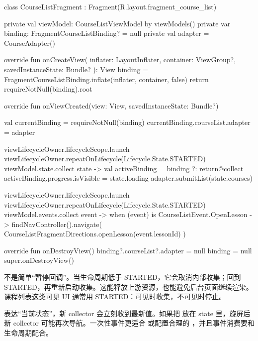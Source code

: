 \begin{ktfix}
class CourseListFragment : Fragment(R.layout.fragment_course_list) {

    private val viewModel: CourseListViewModel by viewModels()
    private var binding: FragmentCourseListBinding? = null
    private val adapter = CourseAdapter()

    override fun onCreateView(
        inflater: LayoutInflater,
        container: ViewGroup?,
        savedInstanceState: Bundle?
    ): View {
        binding = FragmentCourseListBinding.inflate(inflater, container, false)
        return requireNotNull(binding).root
    }

    override fun onViewCreated(view: View, savedInstanceState: Bundle?) {
        val currentBinding = requireNotNull(binding)
        currentBinding.courseList.adapter = adapter

        viewLifecycleOwner.lifecycleScope.launch {
            viewLifecycleOwner.repeatOnLifecycle(Lifecycle.State.STARTED) {
                viewModel.state.collect { state ->
                    val activeBinding = binding ?: return@collect
                    activeBinding.progress.isVisible = state.loading
                    adapter.submitList(state.courses)
                }
            }
        }

        viewLifecycleOwner.lifecycleScope.launch {
            viewLifecycleOwner.repeatOnLifecycle(Lifecycle.State.STARTED) {
                viewModel.events.collect { event ->
                    when (event) {
                        is CourseListEvent.OpenLesson -> findNavController().navigate(
                            CourseListFragmentDirections.openLesson(event.lessonId)
                        )
                    }
                }
            }
        }
    }

    override fun onDestroyView() {
        binding?.courseList?.adapter = null
        binding = null
        super.onDestroyView()
    }
}
\end{ktfix}

\begin{idea}
 不是简单“暂停回调”。当生命周期低于 STARTED，它会取消内部收集；回到 STARTED，再重新启动收集。这能释放上游资源，也能避免后台页面继续渲染。课程列表这类可见 UI 通常用 STARTED：可见时收集，不可见时停止。
\end{idea}

\begin{pitfall}
 表达“当前状态”，新 collector 会立刻收到最新值。如果把  放在 state 里，旋屏后新 collector 可能再次导航。一次性事件更适合  或配置合理的 ，并且事件消费要和生命周期配合。
\end{pitfall}


